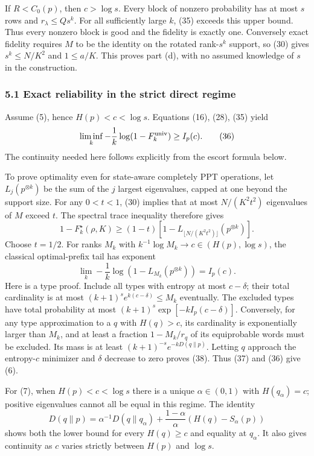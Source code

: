 \documentclass[11pt]{article}
\begin{document}
If \(R<C_0(p)\), then \(c>\log s\). Every block of nonzero probability has at most \(s\) rows and \(r_\lambda\le Qs^k\). For all sufficiently large \(k\), (35) exceeds this upper bound. Thus every nonzero block is good and the fidelity is exactly one. Conversely exact fidelity requires \(M\) to be the identity on the rotated rank-\(s^k\) support, so (30) gives \(s^k\le N/K^2\) and \(1\le a/K\). This proves part (d), with no assumed knowledge of \(s\) in the construction.

\hypertarget{exact-reliability-in-the-strict-direct-regime}{%
\subsubsection{5.1 Exact reliability in the strict direct regime}\label{exact-reliability-in-the-strict-direct-regime}}

Assume (5), hence \(H(p)<c<\log s\). Equations (16), (28), (35) yield \[
 \liminf_k-\frac1k\log(1-F_k^{\rm univ})\ge I_p(c).
 \tag{36}
\] The continuity needed here follows explicitly from the escort formula below.

To prove optimality even for state-aware completely PPT operations, let \(L_j(p^{\otimes k})\) be the sum of the \(j\) largest eigenvalues, capped at one beyond the support size. For any \(0<t<1\), (30) implies that at most \(N/(K^2t^2)\) eigenvalues of \(M\) exceed \(t\). The spectral trace inequality therefore gives \[
 1-F_k^\star(\rho,K)\ge
 (1-t)\left[1-L_{\lfloor N/(K^2t^2)\rfloor}(p^{\otimes k})\right].
 \tag{37}
\] Choose \(t=1/2\). For ranks \(M_k\) with \(k^{-1}\log M_k\to c\in(H(p),\log s)\), the classical optimal-prefix tail has exponent \[
 \lim_k-\frac1k\log(1-L_{M_k}(p^{\otimes k}))=I_p(c).
 \tag{38}
\] Here is a type proof. Include all types with entropy at most \(c-\delta\); their total cardinality is at most \((k+1)^s e^{k(c-\delta)}\le M_k\) eventually. The excluded types have total probability at most \((k+1)^s\exp[-k I_p(c-\delta)]\). Conversely, for any type approximation to a \(q\) with \(H(q)>c\), its cardinality is exponentially larger than \(M_k\), and at least a fraction \(1-M_k/r_q\) of its equiprobable words must be excluded. Its mass is at least \((k+1)^{-s}e^{-kD(q\|p)}\). Letting \(q\) approach the entropy-\(c\) minimizer and \(\delta\) decrease to zero proves (38). Thus (37) and (36) give (6).

For (7), when \(H(p)<c<\log s\) there is a unique \(\alpha\in(0,1)\) with \(H(q_\alpha)=c\); positive eigenvalues cannot all be equal in this regime. The identity \[
 D(q\|p)=\alpha^{-1}D(q\|q_\alpha)
       +\frac{1-\alpha}{\alpha}(H(q)-S_\alpha(p))
 \tag{39}
\] shows both the lower bound for every \(H(q)\ge c\) and equality at \(q_\alpha\). It also gives continuity as \(c\) varies strictly between \(H(p)\) and \(\log s\).
\end{document}
